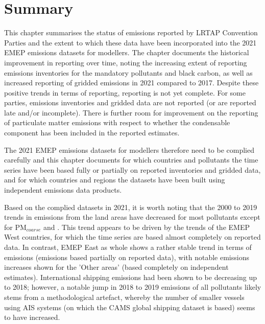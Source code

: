 \section{Summary}

This chapter summarises the status of emissions reported by LRTAP Convention Parties and the extent to which these data have been incorporated into the 2021 EMEP emissions datasets for modellers. The chapter documents the historical improvement in reporting over time, noting the increasing extent of reporting emissions inventories for the mandatory pollutants and black carbon, as well as increased reporting of gridded emissions in 2021 compared to 2017. Despite these positive trends in terms of reporting, reporting is not yet complete. For some parties, emissions inventories and gridded data are not reported (or are reported late and/or incomplete). There is further room for improvement on the reporting of particulate matter emissions with respect to whether the condensable component has been included in the reported estimates.

The 2021 EMEP emissions datasets for modellers therefore need to be complied carefully and this chapter documents for which countries and pollutants the time series have been based fully or partially on reported inventories and gridded data, and for which countries and regions the datasets have been built using independent emissions data products.

Based on the complied datasets in 2021, it is worth noting that the 2000 to 2019 trends in emissions from the land areas have decreased for most pollutants except for PM$_{coarse}$  and \nhiii. This trend appears to be driven by the trends of the EMEP West countries, for which the time series are based almost completely on reported data. In contrast, EMEP East as whole shows a rather stable trend in terms of emissions (emissions based partially on reported data), with notable emissions increases shown for the 'Other areas' (based completely on independent estimates). International shipping emissions had been shown to be decreasing up to 2018; however, a notable jump in 2018  to 2019 emissions of all pollutants likely stems from a methodological artefact, whereby the number of smaller vessels using AIS systems (on which the CAMS global shipping dataset is based) seems to have increased.

\clearpage
\renewcommand\bibname{References}      %
%

